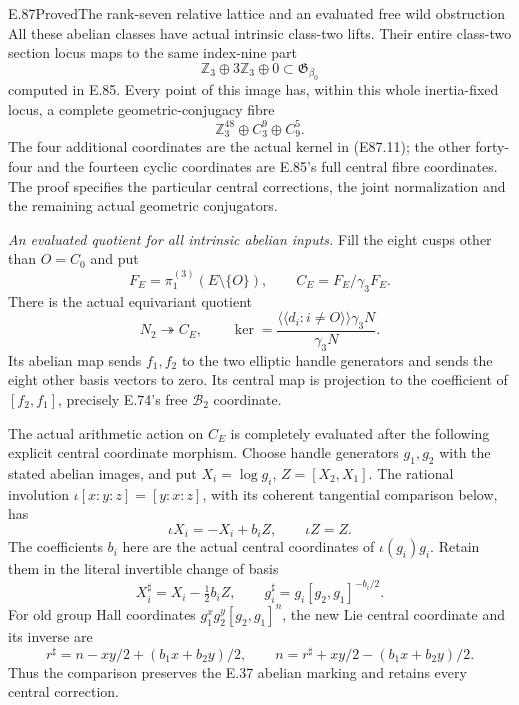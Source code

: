 \begin{statement}{E.87}{Proved}{The rank-seven relative lattice and an evaluated free wild obstruction}
All these abelian classes have actual intrinsic
class-two lifts. Their entire class-two section
locus maps to the same index-nine part
\[
                  \mathbb Z_3\oplus3\mathbb Z_3\oplus0
                      \subset\mathfrak G_{\beta_0}
 \tag{E87.14}
\]
computed in E.85. Every point of this image has,
within this whole inertia-fixed locus, a complete
geometric-conjugacy fibre
\[
                     \mathbb Z_3^{48}\oplus C_3^9\oplus C_9^5.
 \tag{E87.15}
\]
The four additional coordinates are the actual
kernel in (E87.11); the other forty-four and the
fourteen cyclic coordinates are E.85's full central
fibre coordinates. The proof specifies the particular
central corrections, the joint normalization and the
remaining actual geometric conjugators.

\emph{An evaluated quotient for all intrinsic abelian inputs.}
Fill the eight cusps other than $O=C_0$ and put
\[
 F_E=\pi_1^{(3)}(E\setminus\{O\}),\qquad
 C_E=F_E/\gamma_3F_E.
 \tag{E87.16}
\]
There is the actual equivariant quotient
\[
 N_2\twoheadrightarrow C_E,\qquad
 \ker=\frac{\langle\!\langle d_i:i\ne O\rangle\!\rangle
                         \gamma_3N}{\gamma_3N}.
 \tag{E87.17}
\]
Its abelian map sends $f_1,f_2$ to the two elliptic
handle generators and sends the eight other basis
vectors to zero. Its central map is projection to
the coefficient of $[f_2,f_1]$, precisely E.74's
free $\mathcal B_2$ coordinate.

The actual arithmetic action on $C_E$ is completely
evaluated after the following explicit central
coordinate morphism. Choose handle generators
$g_1,g_2$ with the stated abelian images, and put
$X_i=\log g_i$, $Z=[X_2,X_1]$. The rational
involution $\iota[x:y:z]=[y:x:z]$, with its
coherent tangential comparison below, has
\[
 \iota X_i=-X_i+b_iZ,\qquad \iota Z=Z.
 \tag{E87.18}
\]
The coefficients $b_i$ here are the actual central
coordinates of $\iota(g_i)g_i$. Retain them in the
literal invertible change of basis
\[
 X_i^\sharp=X_i-\tfrac12b_iZ,\qquad
 g_i^\sharp=g_i[g_2,g_1]^{-b_i/2}.
 \tag{E87.19}
\]
For old group Hall coordinates
$g_1^xg_2^y[g_2,g_1]^n$, the new Lie central
coordinate and its inverse are
\[
 r^\sharp=n-xy/2+(b_1x+b_2y)/2,
 \qquad n=r^\sharp+xy/2-(b_1x+b_2y)/2.
 \tag{E87.20}
\]
Thus the comparison preserves the E.37 abelian
marking and retains every central correction.


\end{statement}
